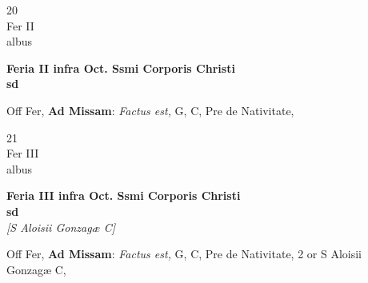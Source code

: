 \documentclass[10pt, openany]{book}
\begin{document}
        \begin{center}
            \begin{minipage}{3.5in}
                \vspace{2em}
                \begin{minipage}{0.5in}
                    {\Huge 20} \\
                    {\normalsize Fer II} \\
                    {\normalsize albus}
                \end{minipage}
                \begin{minipage}{3.0in}
                    \textbf{ \large Feria II infra Oct. Ssmi Corporis Christi \\
                    \textnormal{\normalsize sd}} \\ 
                \end{minipage}
                \begin{justify}Off Fer, \textbf{Ad Missam}: \textit{Factus est,} G, C, Pre de Nativitate,  
                \end{justify}
            \end{minipage}
        \end{center}
    
        \begin{center}
            \begin{minipage}{3.5in}
                \vspace{2em}
                \begin{minipage}{0.5in}
                    {\Huge 21} \\
                    {\normalsize Fer III} \\
                    {\normalsize albus}
                \end{minipage}
                \begin{minipage}{3.0in}
                    \textbf{ \large Feria III infra Oct. Ssmi Corporis Christi \\
                    \textnormal{\normalsize sd}} \\ \textit{[S Aloisii Gonzagæ C]} \\ 
                \end{minipage}
                \begin{justify}Off Fer, \textbf{Ad Missam}: \textit{Factus est,} G, C, Pre de Nativitate, 2 or S Aloisii Gonzagæ C,  
                \end{justify}
            \end{minipage}
        \end{center}
    
\end{document}
